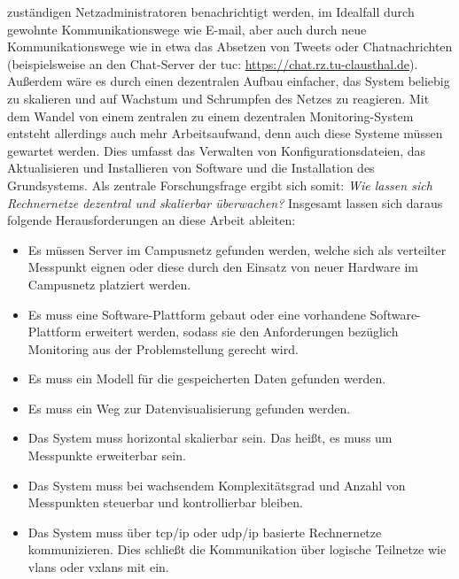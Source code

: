 \documentclass[titlepage]{report}
\begin{document}
zuständigen Netzadministratoren benachrichtigt werden, im Idealfall
durch gewohnte Kommunikationswege wie E\hyp{}mail, aber auch durch neue
Kommunikationswege wie in etwa das Absetzen von Tweets oder
Chatnachrichten (beispielsweise an den Chat\hyp{}Server der \gls{tuc}:
\url{https://chat.rz.tu-clausthal.de}). Außerdem wäre es durch
einen dezentralen Aufbau einfacher, das System beliebig zu skalieren
und auf Wachstum und Schrumpfen des Netzes zu reagieren. Mit dem Wandel
von einem zentralen zu einem dezentralen Monitoring\hyp{}System entsteht
allerdings auch mehr Arbeitsaufwand, denn auch diese Systeme müssen
gewartet werden. Dies umfasst das Verwalten von Konfigurationsdateien,
das Aktualisieren und Installieren von Software und die Installation des
Grundsystems. Als zentrale Forschungsfrage ergibt sich somit: \emph{Wie
lassen sich Rechnernetze dezentral und skalierbar überwachen?}
Insgesamt lassen sich daraus folgende Herausforderungen an diese Arbeit
ableiten:

\begin{itemize}
    \item Es müssen Server im Campusnetz gefunden werden, welche sich
          als verteilter Messpunkt eignen oder diese durch den Einsatz
          von neuer Hardware im Campusnetz platziert werden.
    \item Es muss eine Software\hyp{}Plattform gebaut oder eine
          vorhandene Software\hyp{}Plattform erweitert werden, sodass
          sie den Anforderungen bezüglich Monitoring aus der
          Problemstellung gerecht wird.
    \item Es muss ein Modell für die gespeicherten Daten gefunden
          werden.
    \item Es muss ein Weg zur Datenvisualisierung gefunden werden.
    \item Das System muss horizontal skalierbar sein. Das heißt, es
          muss um Messpunkte erweiterbar sein.
    \item Das System muss bei wachsendem Komplexitätsgrad und Anzahl von
          Messpunkten steuerbar und kontrollierbar bleiben.
      \item Das System muss über \gls{tcp}/\gls{ip} oder
           \gls{udp}/\gls{ip} basierte Rechnernetze
           kommunizieren. Dies schließt die Kommunikation über logische
           Teilnetze wie \glspl{vlan} oder \glspl{vxlan} mit ein.
\end{itemize}
\end{document}
